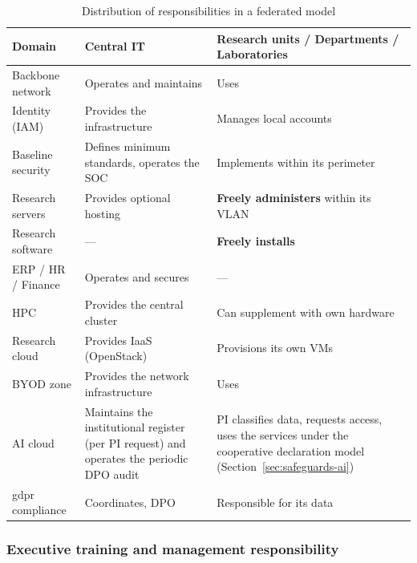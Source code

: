\begin{table}[H]
\centering
\caption{Distribution of responsibilities in a federated model}
\label{tab:gouv-federee}
\small
\begin{tabularx}{\textwidth}{l X X}
\toprule
\textbf{Domain} & \textbf{Central IT} &
    \textbf{Research units / Departments / Laboratories} \\
\midrule
Backbone network & Operates and maintains & Uses \\
\addlinespace
Identity (IAM) & Provides the infrastructure & Manages local accounts \\
\addlinespace
Baseline security & Defines minimum standards, operates the SOC &
    Implements within its perimeter \\
\addlinespace
Research servers & Provides optional hosting &
    \textbf{Freely administers} within its VLAN \\
\addlinespace
Research software & --- & \textbf{Freely installs} \\
\addlinespace
ERP / HR / Finance & Operates and secures & --- \\
\addlinespace
HPC & Provides the central cluster & Can supplement with own hardware \\
\addlinespace
Research cloud & Provides IaaS (OpenStack) &
    Provisions its own VMs \\
\addlinespace
BYOD zone & Provides the network infrastructure & Uses \\
\addlinespace
AI cloud & Maintains the institutional register (per PI request)
    and operates the periodic DPO audit & PI classifies data,
    requests access, uses the services under the cooperative
    declaration model (Section~\ref{sec:safeguards-ai}) \\
\addlinespace
\gls{gdpr} compliance & Coordinates, DPO & Responsible for its data \\
\bottomrule
\end{tabularx}
\end{table}

\subsubsection{Executive training and management responsibility}
\label{sec:exec-training}

